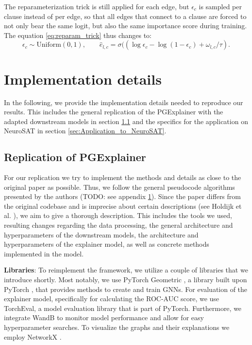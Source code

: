 The reparameterization trick is still applied for each edge, but $\epsilon_c$ is sampled per clause instead of per edge, so that all edges that connect to a clause are forced to not only bear the same logit, but also the same importance score during training. The equation \ref{eq:reparam_trick} thus changes to:
\begin{equation}
    \epsilon_c \sim \text{Uniform}(0,1), \qquad \hat{e}_{l,c}=\sigma((\log \epsilon_c - \log(1-\epsilon_c)+\omega_{l,c}/\tau).
\end{equation}


\section{Implementation details}
In the following, we provide the implementation details needed to reproduce our results. This includes the general replication of the PGExplainer \cite{} with the adapted downstream models in section \ref{sec:Replication_of_PGExplainer} and the specifics for the application on NeuroSAT \cite{} in section \ref{sec:Application_to_NeuroSAT}.


\subsection{Replication of PGExplainer}
\label{sec:Replication_of_PGExplainer}

For our replication we try to implement the methods and details as close to the original paper as possible. Thus, we follow the general pseudocode algorithms presented by the authors (TODO: see appendix \ref{}). Since the paper differs from the original codebase and is imprecise about certain descriptions (see Holdijk et al. \cite{holdijk2021re}), we aim to give a thorough description. This includes the tools we used, resulting changes regarding the data processing, the general architecture and hyperparameters of the downstream models, the architecture and hyperparameters of the explainer model, as well as concrete methods implemented in the model. \bigskip

\textbf{Libraries}: To reimplement the framework, we utilize a couple of libraries that we introduce shortly. Most notably, we use PyTorch Geometric \cite{Fey/Lenssen/2019}, a library built upon PyTorch \cite{paszke2019pytorch}, that provides methods to create and train GNNs. For evaluation of the explainer model, specifically for calculating the ROC-AUC score, we use TorchEval, a model evaluation library that is part of PyTorch. Furthermore, we integrate WandB \cite{wandb} to monitor model performance and allow for easy hyperparameter searches. To visualize the graphs and their explanations we employ NetworkX \cite{SciPyProceedings_11}.\bigskip

